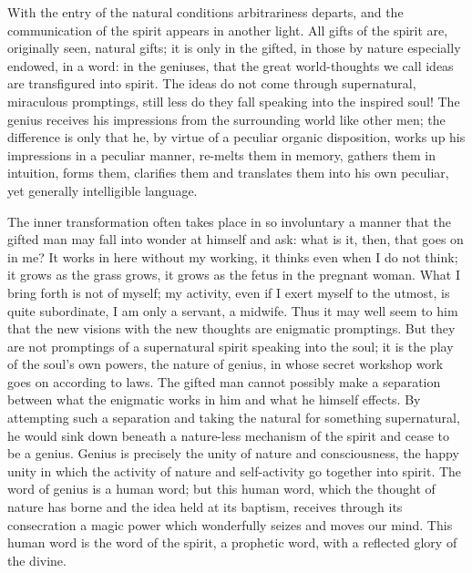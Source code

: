 \documentclass[12pt,a4paper,openany]{book}
\newcommand{\opage}[1]{\marginnote{\footnotesize\textit{[#1]}}}
\begin{document}
With the entry of the natural conditions arbitrariness
departs, and the communication of the spirit appears in another
light. All gifts of the spirit are, originally seen, natural gifts;
\setcounter{footnote}{0}%
\opage{13}it is only in the gifted, in those by nature especially endowed,
in a word: in the geniuses, that the great world-thoughts we
call ideas are transfigured into spirit. The ideas do not come
through supernatural, miraculous promptings, still less do
they fall speaking into the inspired soul! The genius
receives his impressions from the surrounding world like other
men; the difference is only that he, by virtue of a
peculiar organic disposition, works up his impressions in
a peculiar manner, re-melts them in memory,
gathers them in intuition, forms them, clarifies them and
translates them into his own peculiar, yet generally intelligible
language.

The inner transformation often takes place in so involuntary
a manner that the gifted man may fall into wonder
at himself and ask: what is it, then, that goes on
in me? It works in here without my working, it
thinks even when I do not think; it grows as
the grass grows, it grows as the fetus in the pregnant woman.
What I bring forth is not of myself;
my activity, even if I exert myself to the
utmost, is quite subordinate, I am only a servant,
a midwife. Thus it may well seem to
him that the new visions with the new thoughts are enigmatic
promptings. But they are not promptings of
a supernatural spirit speaking into the soul; it is
the play of the soul's own powers, the nature of genius, in whose
secret workshop work goes on according to laws. The gifted man
cannot possibly make a separation between what
the enigmatic works in him and what he himself effects.
By attempting such a separation and taking the
natural for something supernatural, he would sink down
beneath a nature-less mechanism of the spirit and cease to be
\setcounter{footnote}{0}%
\opage{14}a genius. Genius is precisely the unity of nature and consciousness,
the happy unity in which the activity of nature and
self-activity go together into spirit. The word of genius is
a human word; but this human word, which the thought of nature
has borne and the idea held at its baptism, receives through
its consecration a magic power which wonderfully seizes and
moves our mind. This human word is the word of the
spirit, a prophetic word, with a reflected glory of the divine.
\end{document}

